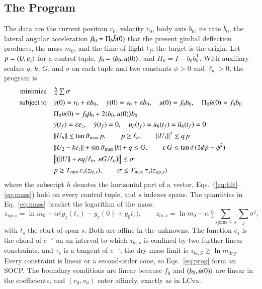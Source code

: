 \subsection{The Program}
The data are the current position $r_0$, velocity $v_0$, body axis $b_0$, its rate $\dot b_0$, the lateral angular acceleration
$\beta_0=\Pi_b\ddot b(0)$ that the present gimbal deflection produces, the mass $m_0$, and the time of flight $t_f$; the target is
the origin. Let $p=\langle U,e_z\rangle$ for a control tuple, $f_0=\langle b_0,u(0)\rangle$, and $\Pi_0=I-b_0b_0^{\mathsf T}$. With auxiliary scalars
$q$, $k$, $G$, and $\sigma$ on each tuple and two constants $\phi>0$ and $\ell_b>0$, the program is
\begin{subequations}\label{eq:prog}
\begin{align}
\text{minimize}\quad & \tfrac h4\textstyle\sum\sigma \label{eq:obj}\\
\text{subject to}\quad & y(0)=r_0+\varepsilon b_0,\quad \dot y(0)=v_0+\varepsilon\dot b_0,\quad u(0)=f_0b_0,\quad \Pi_0\dot u(0)=f_0\dot b_0 \notag\\
& \Pi_0\ddot u(0)=f_0\beta_0+2\langle b_0,\dot u(0)\rangle\dot b_0 \label{eq:bc0}\\
& y(t_f)=\varepsilon e_z,\quad \dot y(t_f)=0,\quad u_h(t_f)=\dot u_h(t_f)=\ddot u_h(t_f)=0 \label{eq:bcf}\\
& \lVert U_h\rVert\le\tan\vartheta_{\max}\,p,\qquad p\ge\ell_b,\qquad \lVert U_1\rVert^2\le q\,p \label{eq:tilt}\\
& \lVert U_2-ke_z\rVert+\sin\vartheta_{\max}\,|k|+q\le G,\qquad \varepsilon\,G\le\tan\delta\,(2\phi p-\phi^2) \label{eq:gimbal}\\
& \bigl\|\bigl(\lVert U\rVert+\varepsilon q/\ell_b,\ \varepsilon G/\ell_b\bigr)\bigr\|\le\sigma \label{eq:sigma}\\
& p\ge T_{\min}\,c_s(z_{lo,s}),\qquad \sigma\le T_{\max}\,\tau_s(z_{up,s}) \label{eq:mass}
\end{align}
\end{subequations}
where the subscript $h$ denotes the horizontal part of a vector, Eqs.~(\ref{eq:tilt}--\ref{eq:mass}) hold on every control
tuple, and $s$ indexes spans. The quantities in Eq.~\eqref{eq:mass} bracket the logarithm of the mass:
\begin{equation}\label{eq:z}
z_{up,s}=\ln m_0-\alpha\bigl(\dot y_z(t_s)-\dot y_z(0)+g_0t_s\bigr),\qquad z_{lo,s}=\ln m_0-\alpha\,\tfrac h4\!\!\sum_{\text{spans}\le s}\sum_{j}\sigma^j ,
\end{equation}
with $t_s$ the start of span $s$. Both are affine in the unknowns. The function $c_s$ is the chord of $e^{-z}$ on an interval
to which $z_{lo,s}$ is confined by two further linear constraints, and $\tau_s$ is a tangent of $e^{-z}$; the dry-mass limit is
$z_{lo,S}\ge\ln m_{dry}$. Every constraint is linear or a second-order cone, so Eqs.~\eqref{eq:prog} form an SOCP. The boundary
conditions are linear because $f_0$ and $\langle b_0,\dot u(0)\rangle$ are linear in the coefficients, and $(r_0,v_0)$ enter affinely,
exactly as in LCvx.

